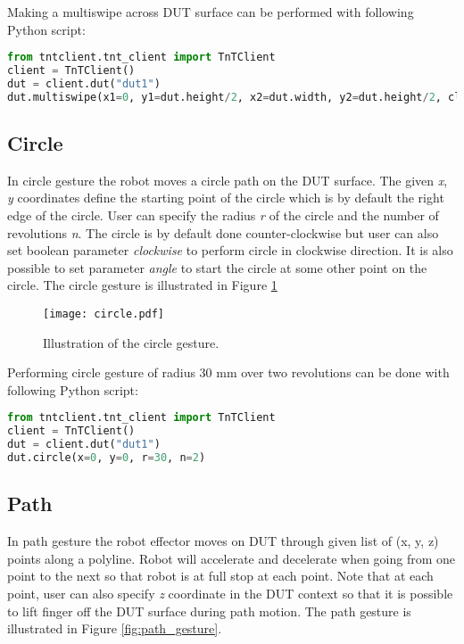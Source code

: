Making a multiswipe across DUT surface can be performed with following Python script:

\begin{lstlisting}[language=Python]
from tntclient.tnt_client import TnTClient
client = TnTClient()
dut = client.dut("dut1")
dut.multiswipe(x1=0, y1=dut.height/2, x2=dut.width, y2=dut.height/2, clearance=0, n=3)
\end{lstlisting}

\subsection{Circle}

In circle gesture the robot moves a circle path on the DUT surface. The given \emph{x}, \emph{y} coordinates define the starting point of the circle which is by default the right edge of the circle. User can specify the radius \emph{r} of the circle and the number of revolutions \emph{n}. The circle is by default done counter-clockwise but user can also set boolean parameter \emph{clockwise} to perform circle in clockwise direction. It is also possible to set parameter \emph{angle} to start the circle at some other point on the circle. The circle gesture is illustrated in Figure \ref{fig:circle_gesture}

\begin{figure}[h]
	\centering
	\texttt{[image: circle.pdf]}
	\caption{Illustration of the circle gesture.}
	\label{fig:circle_gesture}
\end{figure}


Performing circle gesture of radius 30 mm over two revolutions can be done with following Python script:

\begin{lstlisting}[language=Python]
from tntclient.tnt_client import TnTClient
client = TnTClient()
dut = client.dut("dut1")
dut.circle(x=0, y=0, r=30, n=2)
\end{lstlisting}

\subsection{Path}

In path gesture the robot effector moves on DUT through given list of (x, y, z) points along a polyline. Robot will accelerate and decelerate when going from one point to the next so that robot is at full stop at each point. Note that at each point, user can also specify \emph{z} coordinate in the DUT context so that it is possible to lift finger off the DUT surface during path motion. The path gesture is illustrated in Figure \ref{fig:path_gesture}.

